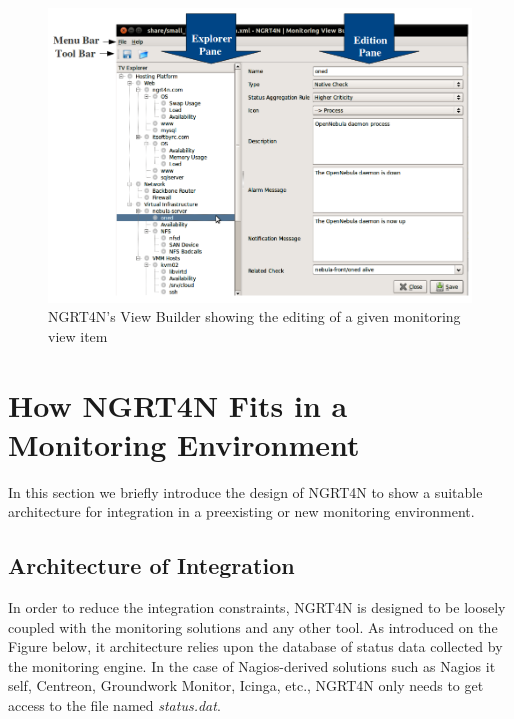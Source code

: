 \documentclass[a4paper,9pt]{article}
\begin{document}
\begin{figure}
\centering
\includegraphics[width=18cm]{images/annotated-editor.png}
\caption{NGRT4N's View Builder showing the editing of a given monitoring view item}
\end{figure} 

\chapter{How NGRT4N Fits in a Monitoring Environment}
In this section we briefly introduce the design of NGRT4N to show a suitable architecture for integration in a preexisting or new monitoring environment. 
 
\section{Architecture of Integration}
In order to reduce the integration constraints, NGRT4N is designed to be loosely coupled with the monitoring solutions and any other tool. As introduced on the Figure below, it architecture relies upon the database of status data collected by the monitoring engine. In the case of Nagios-derived solutions such as Nagios it self, Centreon, Groundwork Monitor, Icinga, etc., NGRT4N only needs to get access to the file named \emph{status.dat}.
\end{document}
